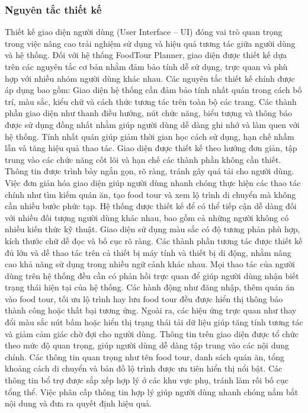 \subsubsection{Nguyên tắc thiết kế}
Thiết kế giao diện người dùng (User Interface – UI) đóng vai trò quan trọng trong việc nâng cao trải nghiệm sử dụng và hiệu quả tương tác giữa người dùng và hệ thống. Đối với hệ thống FoodTour Planner, giao diện được thiết kế dựa trên các nguyên tắc cơ bản nhằm đảm bảo tính dễ sử dụng, trực quan và phù hợp với nhiều nhóm người dùng khác nhau. Các nguyên tắc thiết kế chính được áp dụng bao gồm:
Giao diện hệ thống cần đảm bảo tính nhất quán trong cách bố trí, màu sắc, kiểu chữ và cách thức tương tác trên toàn bộ các trang. Các thành phần giao diện như thanh điều hướng, nút chức năng, biểu tượng và thông báo được sử dụng đồng nhất nhằm giúp người dùng dễ dàng ghi nhớ và làm quen với hệ thống. Tính nhất quán giúp giảm thời gian học cách sử dụng, hạn chế nhầm lẫn và tăng hiệu quả thao tác.
Giao diện được thiết kế theo hướng đơn giản, tập trung vào các chức năng cốt lõi và hạn chế các thành phần không cần thiết. Thông tin được trình bày ngắn gọn, rõ ràng, tránh gây quá tải cho người dùng. Việc đơn giản hóa giao diện giúp người dùng nhanh chóng thực hiện các thao tác chính như tìm kiếm quán ăn, tạo food tour và xem lộ trình di chuyển mà không cần nhiều bước phức tạp.
Hệ thống được thiết kế để có thể tiếp cận dễ dàng đối với nhiều đối tượng người dùng khác nhau, bao gồm cả những người không có nhiều kiến thức kỹ thuật. Giao diện sử dụng màu sắc có độ tương phản phù hợp, kích thước chữ dễ đọc và bố cục rõ ràng. Các thành phần tương tác được thiết kế đủ lớn và dễ thao tác trên cả thiết bị máy tính và thiết bị di động, nhằm nâng cao khả năng sử dụng trong nhiều ngữ cảnh khác nhau.
Mọi thao tác của người dùng trên hệ thống đều cần có phản hồi trực quan để giúp người dùng nhận biết trạng thái hiện tại của hệ thống. Các hành động như đăng nhập, thêm quán ăn vào food tour, tối ưu lộ trình hay lưu food tour đều được hiển thị thông báo thành công hoặc thất bại tương ứng. Ngoài ra, các hiệu ứng trực quan như thay đổi màu sắc nút bấm hoặc hiển thị trạng thái tải dữ liệu giúp tăng tính tương tác và giảm cảm giác chờ đợi cho người dùng.
Thông tin trên giao diện được tổ chức theo mức độ quan trọng, giúp người dùng dễ dàng tập trung vào các nội dung chính. Các thông tin quan trọng như tên food tour, danh sách quán ăn, tổng khoảng cách di chuyển và bản đồ lộ trình được ưu tiên hiển thị nổi bật. Các thông tin bổ trợ được sắp xếp hợp lý ở các khu vực phụ, tránh làm rối bố cục tổng thể. Việc phân cấp thông tin hợp lý giúp người dùng nhanh chóng nắm bắt nội dung và đưa ra quyết định hiệu quả.
